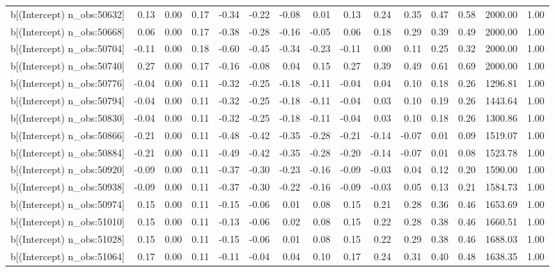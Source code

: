 \begin{table}[ht]
\begin{tabular}{rrrrrrrrrrrrrrr}
  b[(Intercept) n\_obs:50632] & 0.13 & 0.00 & 0.17 & -0.34 & -0.22 & -0.08 & 0.01 & 0.13 & 0.24 & 0.35 & 0.47 & 0.58 & 2000.00 & 1.00 \\ 
  b[(Intercept) n\_obs:50668] & 0.06 & 0.00 & 0.17 & -0.38 & -0.28 & -0.16 & -0.05 & 0.06 & 0.18 & 0.29 & 0.39 & 0.49 & 2000.00 & 1.00 \\ 
  b[(Intercept) n\_obs:50704] & -0.11 & 0.00 & 0.18 & -0.60 & -0.45 & -0.34 & -0.23 & -0.11 & 0.00 & 0.11 & 0.25 & 0.32 & 2000.00 & 1.00 \\ 
  b[(Intercept) n\_obs:50740] & 0.27 & 0.00 & 0.17 & -0.16 & -0.08 & 0.04 & 0.15 & 0.27 & 0.39 & 0.49 & 0.61 & 0.69 & 2000.00 & 1.00 \\ 
  b[(Intercept) n\_obs:50776] & -0.04 & 0.00 & 0.11 & -0.32 & -0.25 & -0.18 & -0.11 & -0.04 & 0.04 & 0.10 & 0.18 & 0.26 & 1296.81 & 1.00 \\ 
  b[(Intercept) n\_obs:50794] & -0.04 & 0.00 & 0.11 & -0.32 & -0.25 & -0.18 & -0.11 & -0.04 & 0.03 & 0.10 & 0.19 & 0.26 & 1443.64 & 1.00 \\ 
  b[(Intercept) n\_obs:50830] & -0.04 & 0.00 & 0.11 & -0.32 & -0.25 & -0.18 & -0.11 & -0.04 & 0.03 & 0.10 & 0.18 & 0.26 & 1300.86 & 1.00 \\ 
  b[(Intercept) n\_obs:50866] & -0.21 & 0.00 & 0.11 & -0.48 & -0.42 & -0.35 & -0.28 & -0.21 & -0.14 & -0.07 & 0.01 & 0.09 & 1519.07 & 1.00 \\ 
  b[(Intercept) n\_obs:50884] & -0.21 & 0.00 & 0.11 & -0.49 & -0.42 & -0.35 & -0.28 & -0.20 & -0.14 & -0.07 & 0.01 & 0.08 & 1523.78 & 1.00 \\ 
  b[(Intercept) n\_obs:50920] & -0.09 & 0.00 & 0.11 & -0.37 & -0.30 & -0.23 & -0.16 & -0.09 & -0.03 & 0.04 & 0.12 & 0.20 & 1590.00 & 1.00 \\ 
  b[(Intercept) n\_obs:50938] & -0.09 & 0.00 & 0.11 & -0.37 & -0.30 & -0.22 & -0.16 & -0.09 & -0.03 & 0.05 & 0.13 & 0.21 & 1584.73 & 1.00 \\ 
  b[(Intercept) n\_obs:50974] & 0.15 & 0.00 & 0.11 & -0.15 & -0.06 & 0.01 & 0.08 & 0.15 & 0.21 & 0.28 & 0.36 & 0.46 & 1653.69 & 1.00 \\ 
  b[(Intercept) n\_obs:51010] & 0.15 & 0.00 & 0.11 & -0.13 & -0.06 & 0.02 & 0.08 & 0.15 & 0.22 & 0.28 & 0.38 & 0.46 & 1660.51 & 1.00 \\ 
  b[(Intercept) n\_obs:51028] & 0.15 & 0.00 & 0.11 & -0.15 & -0.06 & 0.01 & 0.08 & 0.15 & 0.22 & 0.29 & 0.38 & 0.46 & 1688.03 & 1.00 \\ 
  b[(Intercept) n\_obs:51064] & 0.17 & 0.00 & 0.11 & -0.11 & -0.04 & 0.04 & 0.10 & 0.17 & 0.24 & 0.31 & 0.40 & 0.48 & 1638.35 & 1.00 \\ 

\end{tabular}
\end{table}
